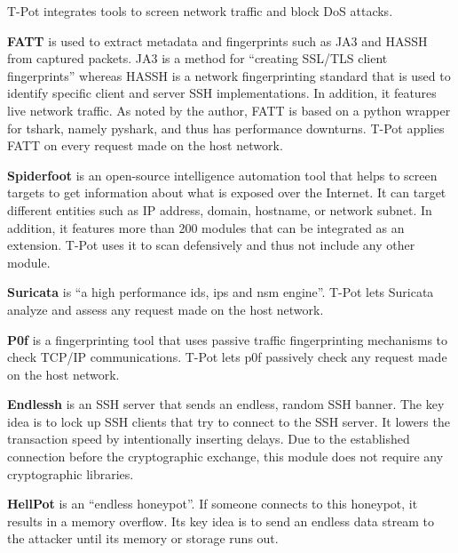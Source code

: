 T-Pot integrates tools to screen network traffic and block DoS attacks.

\textbf{FATT} \cite{fatt2021} is used to extract metadata and fingerprints such as JA3 \cite{ja32021} and HASSH \cite{hassh2021} from captured packets.
JA3 is a method for \enquote{creating SSL/TLS client fingerprints} whereas HASSH is a network fingerprinting standard that is used to identify specific client and server SSH implementations.
In addition, it features live network traffic.
As noted by the author, FATT is based on a python wrapper for tshark, namely pyshark, and thus has performance downturns.
T-Pot applies FATT on every request made on the host network.

\textbf{Spiderfoot} \cite{spiderfoot2021} is an open-source intelligence automation tool that helps to screen targets to get information about what is exposed over the Internet.
It can target different entities such as IP address, domain, hostname, or network subnet.
In addition, it features more than 200 modules that can be integrated as an extension.
T-Pot uses it to scan defensively and thus not include any other module.

\textbf{Suricata} \cite{suricata2021} is \enquote{a high performance \ac{ids}, \ac{ips} and \ac{nsm} engine}.
T-Pot lets Suricata analyze and assess any request made on the host network.

\textbf{P0f} \cite{p0f2021} is a fingerprinting tool that uses passive traffic fingerprinting mechanisms to check TCP/IP communications.
T-Pot lets p0f passively check any request made on the host network.

\textbf{Endlessh} \cite{endlessh2021} is an SSH server that sends an endless, random SSH banner.
The key idea is to lock up SSH clients that try to connect to the SSH server.
It lowers the transaction speed by intentionally inserting delays.
Due to the established connection before the cryptographic exchange, this module does not require any cryptographic libraries.

\textbf{HellPot} \cite{hellpot2021} is an \enquote{endless honeypot}.
If someone connects to this honeypot, it results in a memory overflow.
Its key idea is to send an endless data stream to the attacker until its memory or storage runs out.

